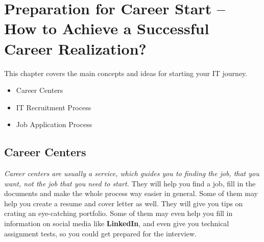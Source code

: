 \chapter{Preparation for Career Start -- How to Achieve a Successful Career Realization?}

This chapter covers the main concepts and ideas for starting your IT journey.

\begin{itemize}
    \item Career Centers
    \item  IT Recruitment Process
    \item Job Application Process
\end{itemize}

\section{Career Centers}
\textit{Career centers are usually a service, which guides you to finding the job, that you want, not the job that you need to start.}
They will help you find a job, fill in the documents and make the whole process way easier in general. Some of them may help you create a resume and cover letter as well. They will give you tips on crating an eye-catching portfolio. Some of them may even help you fill in information on social media like \textbf{LinkedIn}, and even give you technical assignment tests, so you could get prepared for the interview.
